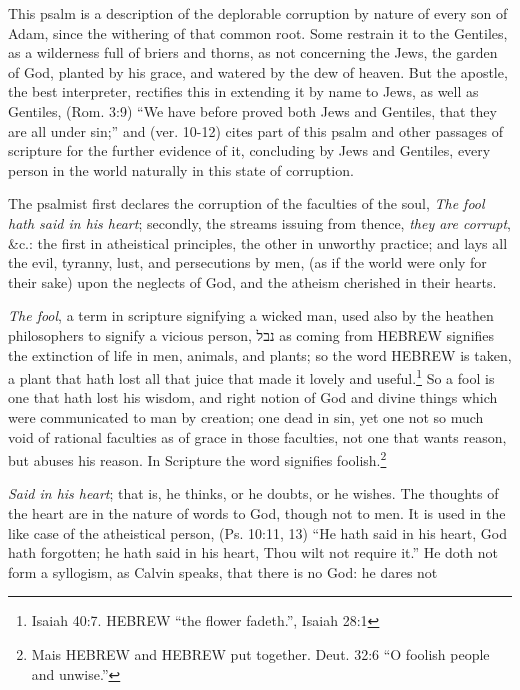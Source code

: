 This psalm is a description of the deplorable corruption by nature
of every son of Adam, since the withering of that common root.
Some restrain it to the Gentiles, as a wilderness full of briers and
thorns, as not concerning the Jews, the garden of God, planted by
his grace, and watered by the dew of heaven. But the apostle, the
best interpreter, rectifies this in extending it by name to Jews, as
well as Gentiles, (Rom. 3:9) ``We have before proved both Jews
and Gentiles, that they are all under sin;'' and (ver. 10-12) cites
part of this psalm and other passages of scripture for the further evidence
of it, concluding by Jews and Gentiles, every person in the
world naturally in this state of corruption.

The psalmist first declares the corruption of the faculties of the
soul, \emph{The fool hath said in his heart}; secondly, the streams issuing
from thence, \emph{they are corrupt}, \&c.: the first in atheistical principles,
the other in unworthy practice; and lays all the evil, tyranny, lust,
and persecutions by men, (as if the world were only for their sake)
upon the neglects of God, and the atheism cherished in their hearts.

\emph{The fool}, a term in scripture signifying a wicked man, used also
by the heathen philosophers to signify a vicious person, נבל as coming
from HEBREW signifies the extinction of life in men, animals, and
plants; so the word HEBREW is taken, a plant that hath lost all that juice
that made it lovely and useful.\footnote{Isaiah 40:7. HEBREW ``the flower fadeth.'', 
Isaiah 28:1} So a fool is one that hath lost
his wisdom, and right notion of God and divine things which were
communicated to man by creation; one dead in sin, yet one not
so much void of rational faculties as of grace in those faculties, not
one that wants reason, but abuses his reason. In Scripture the word
signifies foolish.\footnote{Mais HEBREW and HEBREW put together. Deut. 32:6 ``O foolish people and unwise.''} 

\emph{Said in his heart}; that is, he thinks, or he doubts, or he wishes.
The thoughts of the heart are in the nature of words to God, though
not to men. It is used in the like case of the atheistical person,
(Ps. 10:11, 13) ``He hath said in his heart, God hath forgotten; he
hath said in his heart, Thou wilt not require it.'' He doth not form
a syllogism, as Calvin speaks, that there is no God: he dares not
